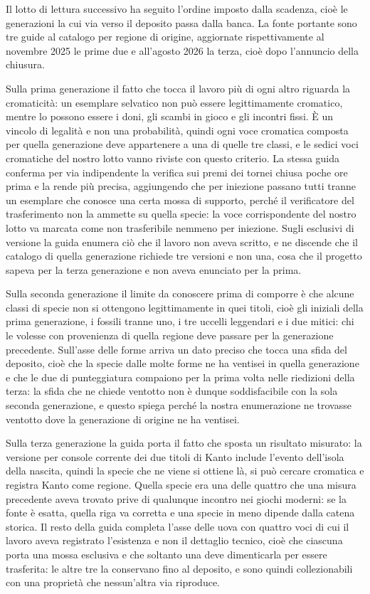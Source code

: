 Il lotto di lettura successivo ha seguito l'ordine imposto dalla scadenza, cioè le generazioni la cui via verso il deposito passa dalla banca. La fonte portante sono tre guide al catalogo per regione di origine, aggiornate rispettivamente al novembre 2025 le prime due e all'agosto 2026 la terza, cioè dopo l'annuncio della chiusura.

Sulla prima generazione \cite{guide-origine-gen1} il fatto che tocca il lavoro più di ogni altro riguarda la cromaticità: un esemplare selvatico non può essere legittimamente cromatico, mentre lo possono essere i doni, gli scambi in gioco e gli incontri fissi. È un vincolo di legalità e non una probabilità, quindi ogni voce cromatica composta per quella generazione deve appartenere a una di quelle tre classi, e le sedici voci cromatiche del nostro lotto vanno riviste con questo criterio. La stessa guida conferma per via indipendente la verifica sui premi dei tornei chiusa poche ore prima e la rende più precisa, aggiungendo che per iniezione passano tutti tranne un esemplare che conosce una certa mossa di supporto, perché il verificatore del trasferimento non la ammette su quella specie: la voce corrispondente del nostro lotto va marcata come non trasferibile nemmeno per iniezione. Sugli esclusivi di versione la guida enumera ciò che il lavoro non aveva scritto, e ne discende che il catalogo di quella generazione richiede tre versioni e non una, cosa che il progetto sapeva per la terza generazione e non aveva enunciato per la prima.

Sulla seconda generazione \cite{guide-origine-gen2} il limite da conoscere prima di comporre è che alcune classi di specie non si ottengono legittimamente in quei titoli, cioè gli iniziali della prima generazione, i fossili tranne uno, i tre uccelli leggendari e i due mitici: chi le volesse con provenienza di quella regione deve passare per la generazione precedente. Sull'asse delle forme arriva un dato preciso che tocca una sfida del deposito, cioè che la specie dalle molte forme ne ha ventisei in quella generazione e che le due di punteggiatura compaiono per la prima volta nelle riedizioni della terza: la sfida che ne chiede ventotto non è dunque soddisfacibile con la sola seconda generazione, e questo spiega perché la nostra enumerazione ne trovasse ventotto dove la generazione di origine ne ha ventisei.

Sulla terza generazione \cite{guide-origine-gen3} la guida porta il fatto che sposta un risultato misurato: la versione per console corrente dei due titoli di Kanto include l'evento dell'isola della nascita, quindi la specie che ne viene si ottiene là, si può cercare cromatica e registra Kanto come regione. Quella specie era una delle quattro che una misura precedente aveva trovato prive di qualunque incontro nei giochi moderni: se la fonte è esatta, quella riga va corretta e una specie in meno dipende dalla catena storica. Il resto della guida completa l'asse delle uova con quattro voci di cui il lavoro aveva registrato l'esistenza e non il dettaglio tecnico, cioè che ciascuna porta una mossa esclusiva e che soltanto una deve dimenticarla per essere trasferita: le altre tre la conservano fino al deposito, e sono quindi collezionabili con una proprietà che nessun'altra via riproduce.

